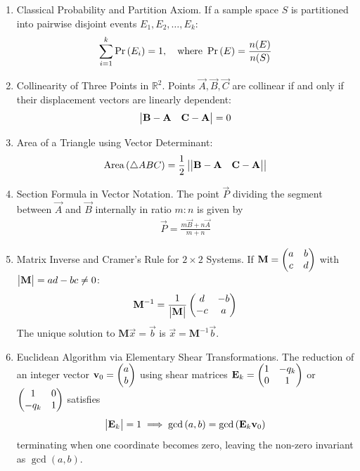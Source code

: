 \begin{enumerate}[label=\thesubsection.\arabic*, ref=\thesubsection.\theenumi]
	\item Classical Probability and Partition Axiom.
	If a sample space $S$ is partitioned into pairwise disjoint events $E_1, E_2, \dots, E_k$:
	\begin{align}
		\sum_{i=1}^k \Pr\left(E_i\right) = 1, \quad \text{where } \Pr\left(E\right) = \frac{n(E)}{n(S)} \label{eq:CBSE10-2019-prob_partition}
	\end{align}
	
	\item Collinearity of Three Points in $\mathbb{R}^2$.
	Points $\vec{A}, \vec{B}, \vec{C}$ are collinear if and only if their displacement vectors are linearly dependent:
	\begin{align}
		\begin{vmatrix}\mathbf{B} - \mathbf{A} & \mathbf{C} - \mathbf{A}\end{vmatrix} = 0 \label{eq:CBSE10-2019-collinear}
	\end{align}
	
	\item Area of a Triangle using Vector Determinant:
	\begin{align}
		\text{Area}\left(\triangle ABC\right) = \frac{1}{2} \left\vert\begin{vmatrix}\mathbf{B} - \mathbf{A} & \mathbf{C} - \mathbf{A}\end{vmatrix}\right\vert \label{eq:CBSE10-2019-triangle_area_det}
	\end{align}
	
	\item Section Formula in Vector Notation.
	The point $\vec{P}$ dividing the segment between $\vec{A}$ and $\vec{B}$ internally in ratio $m:n$ is given by
	\begin{align}
		\vec{P} = \frac{m\vec{B} + n\vec{A}}{m + n} \label{eq:CBSE10-2019-section_formula}
	\end{align}
	
	\item Matrix Inverse and Cramer's Rule for $2 \times 2$ Systems.
	If $\mathbf{M} = \begin{pmatrix}a & b \\ c & d\end{pmatrix}$ with $\begin{vmatrix}\mathbf{M}\end{vmatrix} = ad - bc \neq 0$:
	\begin{align}
		\mathbf{M}^{-1} = \frac{1}{\begin{vmatrix}\mathbf{M}\end{vmatrix}} \begin{pmatrix}d & -b \\ -c & a\end{pmatrix} \label{eq:CBSE10-2019-matrix_inverse}
	\end{align}
	The unique solution to $\mathbf{M}\vec{x} = \vec{b}$ is $\vec{x} = \mathbf{M}^{-1}\vec{b}$.
	
	\item Euclidean Algorithm via Elementary Shear Transformations.
	The reduction of an integer vector $\mathbf{v}_0 = \begin{pmatrix}a \\ b\end{pmatrix}$ using shear matrices $\mathbf{E}_k = \begin{pmatrix}1 & -q_k \\ 0 & 1\end{pmatrix}$ or $\begin{pmatrix}1 & 0 \\ -q_k & 1\end{pmatrix}$ satisfies
	\begin{align}
		\begin{vmatrix}\mathbf{E}_k\end{vmatrix} = 1 \implies \gcd\left(a, b\right) = \gcd\left(\mathbf{E}_k \mathbf{v}_0\right) \label{eq:CBSE10-2019-euclid_shear}
	\end{align}
	terminating when one coordinate becomes zero, leaving the non-zero invariant as $\gcd(a, b)$.
	

\end{enumerate}
